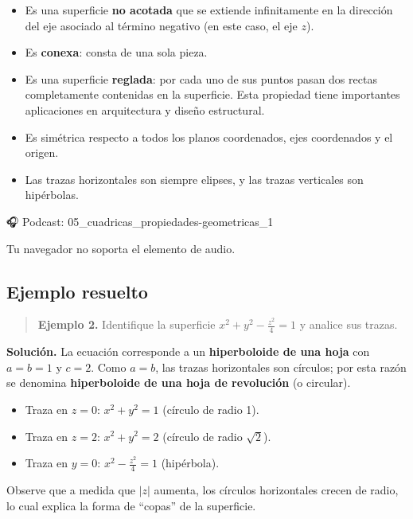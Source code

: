 \documentclass[
]{book}
\providecommand{\tightlist}{%
  \setlength{\itemsep}{0pt}\setlength{\parskip}{0pt}}
\begin{document}
\begin{itemize}
\tightlist
\item
  Es una superficie \textbf{no acotada} que se extiende infinitamente en la dirección del eje asociado al término negativo (en este caso, el eje \(z\)).
\item
  Es \textbf{conexa}: consta de una sola pieza.
\item
  Es una superficie \textbf{reglada}: por cada uno de sus puntos pasan dos rectas completamente contenidas en la superficie. Esta propiedad tiene importantes aplicaciones en arquitectura y diseño estructural.
\item
  Es simétrica respecto a todos los planos coordenados, ejes coordenados y el origen.
\item
  Las trazas horizontales son siempre elipses, y las trazas verticales son hipérbolas.
\end{itemize}

🎧 Podcast: 05\_cuadricas\_propiedades-geometricas\_1

Tu navegador no soporta el elemento de audio.

\subsection{Ejemplo resuelto}\label{ejemplo-resuelto-17}

\begin{quote}
\textbf{Ejemplo 2.} Identifique la superficie \(x^2 + y^2 - \frac{z^2}{4} = 1\) y analice sus trazas.
\end{quote}

\textbf{Solución.} La ecuación corresponde a un \textbf{hiperboloide de una hoja} con \(a = b = 1\) y \(c = 2\). Como \(a = b\), las trazas horizontales son círculos; por esta razón se denomina \textbf{hiperboloide de una hoja de revolución} (o circular).

\begin{itemize}
\tightlist
\item
  Traza en \(z = 0\): \(x^2 + y^2 = 1\) (círculo de radio 1).
\item
  Traza en \(z = 2\): \(x^2 + y^2 = 2\) (círculo de radio \(\sqrt{2}\)).
\item
  Traza en \(y = 0\): \(x^2 - \frac{z^2}{4} = 1\) (hipérbola).
\end{itemize}

Observe que a medida que \(|z|\) aumenta, los círculos horizontales crecen de radio, lo cual explica la forma de ``copas'' de la superficie.
\end{document}
